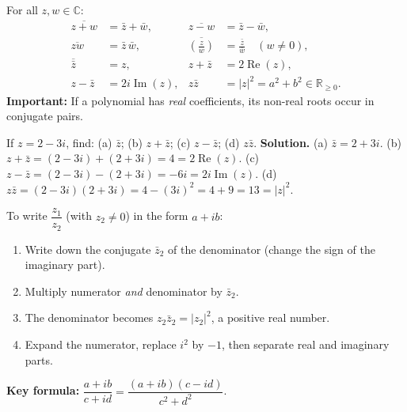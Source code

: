 \documentclass[11pt]{article}
\newcommand{\cle}[1]{{\popxbold\color{popdark}#1}}
\begin{document}
\begin{propriete}
For all $z, w \in \mathbb{C}$:
\begin{align*}
\overline{z+w} &= \bar{z} + \bar{w}, &
\overline{z-w} &= \bar{z} - \bar{w}, \\
\overline{zw} &= \bar{z}\,\bar{w}, &
\overline{\left(\frac{z}{w}\right)} &= \frac{\bar{z}}{\bar{w}}\quad (w\neq 0), \\
\overline{\bar{z}} &= z, &
z + \bar{z} &= 2\operatorname{Re}(z), \\
z - \bar{z} &= 2i\operatorname{Im}(z), &
z\bar{z} &= |z|^2 = a^2 + b^2 \in \mathbb{R}_{\ge 0}.
\end{align*}
\textbf{Important:} If a polynomial has \emph{real} coefficients, its non-real roots occur in conjugate pairs.
\end{propriete}

\begin{exoresolu}
If $z = 2 - 3i$, find: (a) $\bar{z}$; (b) $z + \bar{z}$; (c) $z - \bar{z}$; (d) $z\bar{z}$.
\tcblower
\textbf{Solution.}
(a) $\bar{z} = 2 + 3i$.
(b) $z + \bar{z} = (2-3i)+(2+3i) = 4 = 2\operatorname{Re}(z)$.
(c) $z - \bar{z} = (2-3i)-(2+3i) = -6i = 2i\operatorname{Im}(z)$.
(d) $z\bar{z} = (2-3i)(2+3i) = 4 - (3i)^2 = 4 + 9 = 13 = |z|^2$.
\end{exoresolu}

\begin{methode}
To write $\dfrac{z_1}{z_2}$ (with $z_2 \neq 0$) in the form $a + ib$:
\begin{enumerate}
\item Write down the \cle{conjugate} $\bar{z}_2$ of the denominator (change the sign of the imaginary part).
\item Multiply numerator \emph{and} denominator by $\bar{z}_2$.
\item The denominator becomes $z_2 \bar{z}_2 = |z_2|^2$, a positive real number.
\item Expand the numerator, replace $i^2$ by $-1$, then separate real and imaginary parts.
\end{enumerate}
\textbf{Key formula:} $\dfrac{a+ib}{c+id} = \dfrac{(a+ib)(c-id)}{c^2 + d^2}$.
\end{methode}
\end{document}
